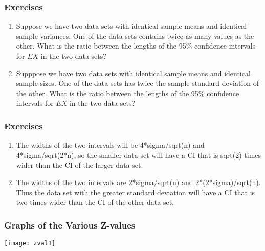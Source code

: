 \begin{frame}
\frametitle{Exercises}

\begin{enumerate}

\item Suppose we have two data sets with identical sample means and
 identical sample variances.  One of the data sets contains twice as
 many values as the other.  What is the ratio between the lengths of
 the 95\% confidence intervals for $EX$ in the two data
 sets?

\item Supppose we have two data sets with identical sample means and
 identical sample sizes.  One of the data sets has twice the sample
 standard deviation of the other.  What is the ratio between the
 lengths of the 95\% confidence intervals for $EX$ in the two data
 sets?

\end{enumerate}

\end{frame}

\begin{frame}
\frametitle{Exercises}

\begin{enumerate}

\item The widths of the two intervals will be 4*sigma/sqrt(n) and
 4*sigma/sqrt(2*n), so the smaller data set will have a CI that is
 sqrt(2) times wider than the CI of the larger data set.

\item The widths of the two intervals are 2*sigma/sqrt(n) and
 2*(2*sigma)/sqrt(n).  Thus the data set with the greater standard
 deviation will have a CI that is two times wider than the CI of the
 other data set.

\end{enumerate}

\end{frame}

\begin{frame}[fragile]\frametitle{Graphs of the Various  Z-values}
\begin{center}
\texttt{[image: zval1]}
\end{center}

\end{frame}

